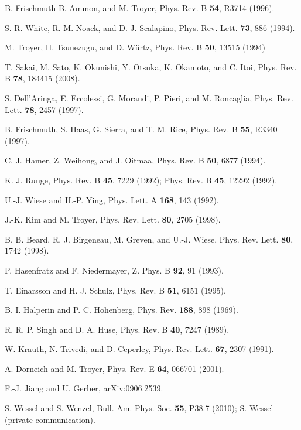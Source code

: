 \documentclass[draft,numberedheadings]{aipproc}
\begin{document}
\begin{thebibliography}{999}
B. Frischmuth B. Ammon, and M. Troyer, Phys. Rev. B {\bf 54}, R3714 (1996).
	
S. R. White, R. M. Noack, and D. J. Scalapino, Phys. Rev. Lett. {\bf 73}, 886 (1994).

M. Troyer, H. Tsunezugu, and D. W\"urtz, Phys. Rev. B {\bf 50}, 13515 (1994)

T. Sakai, M. Sato, K. Okunishi, Y. Otsuka, K. Okamoto, and C. Itoi,
Phys. Rev. B {\bf 78}, 184415 (2008). 

S. Dell'Aringa, E. Ercolessi, G. Morandi, P. Pieri, and M. Roncaglia,
Phys. Rev. Lett. {\bf 78}, 2457 (1997).

B. Frischmuth, S. Haas, G. Sierra, and T. M. Rice, Phys. Rev. B {\bf 55}, R3340 (1997).

C. J. Hamer, Z. Weihong, and J. Oitmaa, Phys. Rev. B {\bf 50}, 6877 (1994).

K. J. Runge, Phys. Rev. B {\bf 45}, 7229 (1992); Phys. Rev. B {\bf 45}, 12292 (1992).

U.-J. Wiese and H.-P. Ying, Phys. Lett. A {\bf 168}, 143 (1992).

J.-K. Kim and M. Troyer, Phys. Rev. Lett. {\bf 80}, 2705 (1998).

B. B. Beard, R. J. Birgeneau, M. Greven, and U.-J. Wiese, Phys. Rev. Lett. {\bf 80}, 1742 (1998).

P. Hasenfratz and F. Niedermayer, Z. Phys. B {\bf 92}, 91 (1993).

T. Einarsson and H. J. Schulz, Phys. Rev. B {\bf 51}, 6151 (1995).

B. I. Halperin and P. C. Hohenberg, Phys. Rev. {\bf 188}, 898 (1969).

R. R. P. Singh and D. A. Huse,  Phys. Rev. B {\bf 40}, 7247 (1989).

W. Krauth, N. Trivedi, and D. Ceperley, Phys. Rev. Lett. {\bf 67}, 2307 (1991). 

A. Dorneich and M. Troyer, Phys. Rev. E {\bf 64}, 066701 (2001). 

F.-J. Jiang and U. Gerber, arXiv:0906.2539.

S. Wessel and S. Wenzel, Bull. Am. Phys. Soc. {\bf 55}, P38.7 (2010); 
S. Wessel (private communication).


\end{thebibliography}
\end{document}
